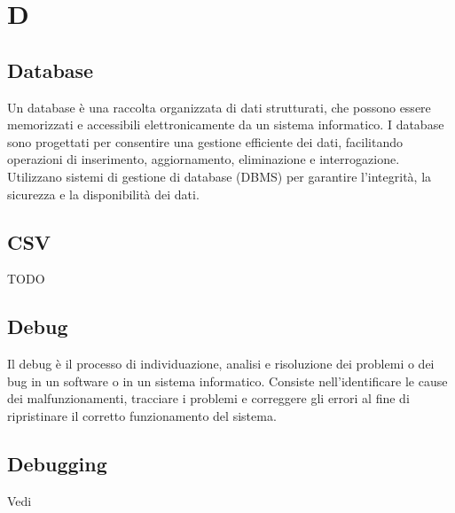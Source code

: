 \section{D}

\vspace{2em}
\subsection*{Database}
Un database è una raccolta organizzata di dati strutturati, che possono essere memorizzati e accessibili elettronicamente da un sistema informatico. I database sono progettati per consentire una gestione efficiente dei dati, facilitando operazioni di inserimento, aggiornamento, eliminazione e interrogazione. Utilizzano sistemi di gestione di database (DBMS) per garantire l'integrità, la sicurezza e la disponibilità dei dati.

\vspace{2em}
\subsection*{CSV}
TODO

\vspace{2em}
\subsection*{Debug}
Il debug è il processo di individuazione, analisi e risoluzione dei problemi o dei bug in un software o in un sistema informatico. Consiste nell'identificare le cause dei malfunzionamenti, tracciare i problemi e correggere gli errori al fine di ripristinare il corretto funzionamento del sistema.

\vspace{2em}
\subsection*{Debugging}
\par Vedi 

\vspace{2em}
